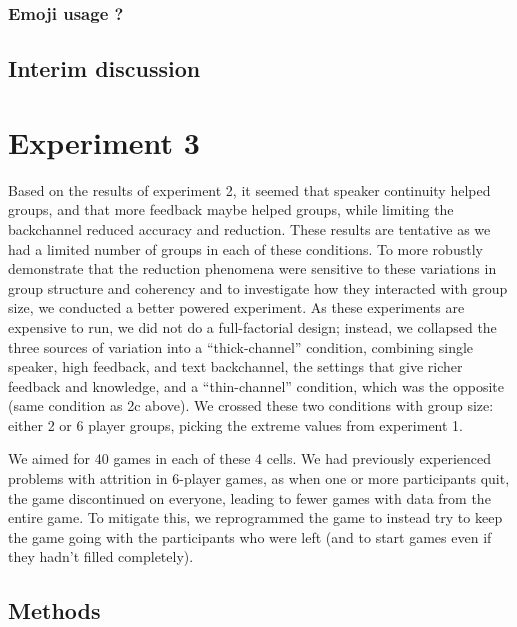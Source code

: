 \documentclass[
  english,
  a4paper,
]{article}
\begin{document}
\hypertarget{emoji-usage}{%
\subsubsection{Emoji usage ?}\label{emoji-usage}}

\hypertarget{interim-discussion-1}{%
\subsection{Interim discussion}\label{interim-discussion-1}}

\hypertarget{experiment-3}{%
\section{Experiment 3}\label{experiment-3}}

Based on the results of experiment 2, it seemed that speaker continuity helped groups, and that more feedback maybe helped groups, while limiting the backchannel reduced accuracy and reduction. These results are tentative as we had a limited number of groups in each of these conditions. To more robustly demonstrate that the reduction phenomena were sensitive to these variations in group structure and coherency and to investigate how they interacted with group size, we conducted a better powered experiment. As these experiments are expensive to run, we did not do a full-factorial design; instead, we collapsed the three sources of variation into a ``thick-channel'' condition, combining single speaker, high feedback, and text backchannel, the settings that give richer feedback and knowledge, and a ``thin-channel'' condition, which was the opposite (same condition as 2c above). We crossed these two conditions with group size: either 2 or 6 player groups, picking the extreme values from experiment 1.

We aimed for 40 games in each of these 4 cells. We had previously experienced problems with attrition in 6-player games, as when one or more participants quit, the game discontinued on everyone, leading to fewer games with data from the entire game. To mitigate this, we reprogrammed the game to instead try to keep the game going with the participants who were left (and to start games even if they hadn't filled completely).

\hypertarget{methods-2}{%
\subsection{Methods}\label{methods-2}}
\end{document}
